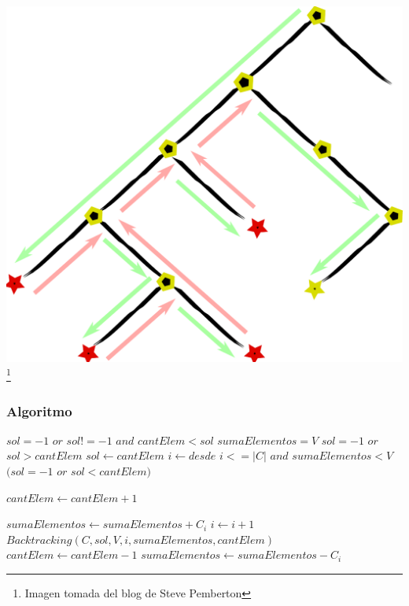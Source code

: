\documentclass[7pt,a4paper]{article}
\begin{document}
\begin{center}
\includegraphics[scale=.2]{backtrack}
\footnote{Imagen tomada del blog de Steve Pemberton}
\end{center}
\subsubsection{Algoritmo}

\begin{codebox}
\li 	\If $sol = -1$ $or$ $sol !=-1$ $and$ $cantElem < sol$ \Then  
  \li 	\If $sumaElementos = V $ \Then
  		\li \If $sol = -1$ $or$ $sol > cantElem$ \Then
  			\li	$sol \gets cantElem$
  			\End
  		\End
  \End 
  \li $i \gets desde$
  \li \While  $i <= |C|$ $and$ $sumaElementos <  V $ \li \Do
  \li \If $(sol = -1$ $or$ $sol < cantElem)$ \Then
  
  \li $cantElem \gets cantElem +1$
  
  \li $sumaElementos \gets sumaElementos+C_{i}$
  \li $i \gets i + 1$ 
  \li $Backtracking(C,sol,V,i,sumaElementos,cantElem)$
  \li $cantElem \gets cantElem - 1$
  \li $sumaElementos \gets sumaElementos - C_{i}$
  
  \End
  \End 
\end{codebox}
\end{document}
